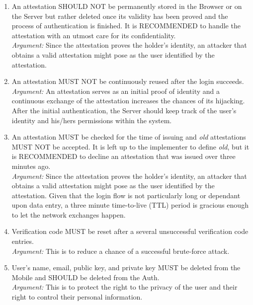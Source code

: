 \begin{enumerate}
            \item An attestation SHOULD NOT be permanently stored in the Browser or on the Server but rather deleted once
                  its validity has been proved and the process of authentication is finished. It is RECOMMENDED to handle 
                  the attestation with an utmost care for its confidentiality.\\
            \textit{Argument:} Since the attestation proves the holder's identity, an attacker that obtains a valid
                               attestation might pose as the user identified by the attestation.

            \item An attestation MUST NOT be continuously reused after the login succeeds.\\
            \textit{Argument:} An attestation serves as an initial proof of identity and a continuous exchange of the
                               attestation increases the chances of its hijacking. After the initial authentication, the
                               Server should keep track of the user's identity and his/hers permissions within the system.

            \item An attestation MUST be checked for the time of issuing and \textit{old} attestations MUST NOT be
                  accepted. It is left up to the implementer to define \textit{old}, but it is RECOMMENDED to
                  decline an attestation that was issued over three minutes ago.\\
            \textit{Argument:} Since the attestation proves the holder's identity, an attacker that obtains a valid
                               attestation might pose as the user identified by the attestation. Given that the login
                               flow is not particularly long or dependant upon data entry, a three minute time-to-live 
                               (TTL) period is gracious enough to let the network exchanges happen.

            \item Verification code MUST be reset after a several unsuccessful verification code entries.\\        
            \textit{Argument:} This is to reduce a chance of a successful brute-force attack.

            \item User's name, email, public key, and private key MUST be deleted from the Mobile and SHOULD be 
                    deleted from the Auth.\\        
            \textit{Argument:} This is to protect the right to the privacy of the user and their right to control 
                                their personal information.
    \end{enumerate}